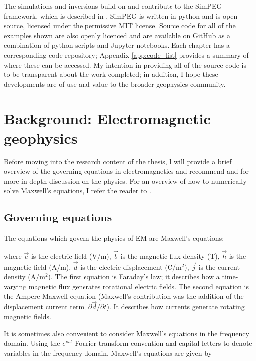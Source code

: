 The simulations and inversions build on and contribute to the SimPEG framework, which is described in \cite{Cockett2015, Heagy2017, Cockett2017}. SimPEG is written in python and is open-source, licensed under the permissive MIT license. Source code for all of the examples shown are also openly licenced and are available on GitHub as a combination of python scripts and Jupyter notebooks. Each chapter has a corresponding code-repository; Appendix \ref{app:code_list} provides a summary of where these can be accessed. My intention in providing all of the source-code is to be transparent about the work completed; in addition, I hope these developments are of use and value to the broader geophysics community.
\section{Background: Electromagnetic geophysics}
\label{sec:background-em}
Before moving into the research content of the thesis, I will provide a brief overview of the governing equations in electromagnetics and recommend \cite{Ward1988} and \cite{emgeosci} for more in-depth discussion on the physics. For an overview of how to numerically solve Maxwell's equations, I refer the reader to \cite{Haber2014}.
\subsection{Governing equations}
The equations which govern the physics of EM are Maxwell's equations:

where $\vec{e}$ is the electric field (V/m), $\vec{b}$ is the magnetic flux density (T), $\vec{h}$ is the magnetic field (A/m), $\vec{d}$ is the electric displacement (C/m$^2$), $\vec{j}$ is the current density (A/m$^2$). The first equation is Faraday's law; it describes how a time-varying magnetic flux generates rotational electric fields. The second equation is the Ampere-Maxwell equation (Maxwell's contribution was the addition of the displacement current term, $\partial \vec{d} / \partial t$). It describes how currents generate rotating magnetic fields.

It is sometimes also convenient to consider Maxwell's equations in the frequency domain. Using the $e^{i\omega t}$ Fourier transform convention and capital letters to denote variables in the frequency domain, Maxwell's equations are given by


